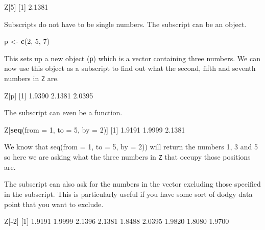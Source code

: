 \documentclass[
]{book}
\newenvironment{Shaded}{\begin{snugshade}}{\end{snugshade}}
\newcommand{\DataTypeTok}[1]{\textcolor[rgb]{0.13,0.29,0.53}{#1}}
\newcommand{\DecValTok}[1]{\textcolor[rgb]{0.00,0.00,0.81}{#1}}
\newcommand{\FloatTok}[1]{\textcolor[rgb]{0.00,0.00,0.81}{#1}}
\newcommand{\KeywordTok}[1]{\textcolor[rgb]{0.13,0.29,0.53}{\textbf{#1}}}
\newcommand{\NormalTok}[1]{#1}
\newcommand{\OperatorTok}[1]{\textcolor[rgb]{0.81,0.36,0.00}{\textbf{#1}}}
\newcommand{\StringTok}[1]{\textcolor[rgb]{0.31,0.60,0.02}{#1}}
\begin{document}
\begin{Shaded}
\begin{Highlighting}[]
\NormalTok{Z[}\DecValTok{5}\NormalTok{]}
\NormalTok{[}\DecValTok{1}\NormalTok{] }\FloatTok{2.1381}
\end{Highlighting}
\end{Shaded}

Subscripts do not have to be single numbers. The subscript can be an object.

\begin{Shaded}
\begin{Highlighting}[]
\NormalTok{p  <-}\StringTok{  }\KeywordTok{c}\NormalTok{(}\DecValTok{2}\NormalTok{, }\DecValTok{5}\NormalTok{, }\DecValTok{7}\NormalTok{)}
\end{Highlighting}
\end{Shaded}

This sets up a new object (\texttt{p}) which is a vector containing three numbers. We can now use this object as a subscript to find out what the second, fifth and seventh numbers in \texttt{Z} are.

\begin{Shaded}
\begin{Highlighting}[]
\NormalTok{Z[p]}
\NormalTok{[}\DecValTok{1}\NormalTok{] }\FloatTok{1.9390} \FloatTok{2.1381} \FloatTok{2.0395}
\end{Highlighting}
\end{Shaded}

The subscript can even be a function.

\begin{Shaded}
\begin{Highlighting}[]
\NormalTok{Z[}\KeywordTok{seq}\NormalTok{(}\DataTypeTok{from =} \DecValTok{1}\NormalTok{, }\DataTypeTok{to =} \DecValTok{5}\NormalTok{, }\DataTypeTok{by =} \DecValTok{2}\NormalTok{)]}
\NormalTok{[}\DecValTok{1}\NormalTok{] }\FloatTok{1.9191} \FloatTok{1.9999} \FloatTok{2.1381}
\end{Highlighting}
\end{Shaded}

We know that seq(from = 1, to = 5, by = 2)) will return the numbers 1, 3 and 5 so here we are asking what the three numbers in \texttt{Z} that occupy those positions are.

The subscript can also ask for the numbers in the vector excluding those specified in the subscript. This is particularly useful if you have some sort of dodgy data point that you want to exclude.

\begin{Shaded}
\begin{Highlighting}[]
\NormalTok{Z[}\OperatorTok{-}\DecValTok{2}\NormalTok{]}
\NormalTok{[}\DecValTok{1}\NormalTok{] }\FloatTok{1.9191} \FloatTok{1.9999} \FloatTok{2.1396} \FloatTok{2.1381} \FloatTok{1.8488} \FloatTok{2.0395} \FloatTok{1.9820} \FloatTok{1.8080} \FloatTok{1.9700}
\end{Highlighting}
\end{Shaded}
\end{document}
